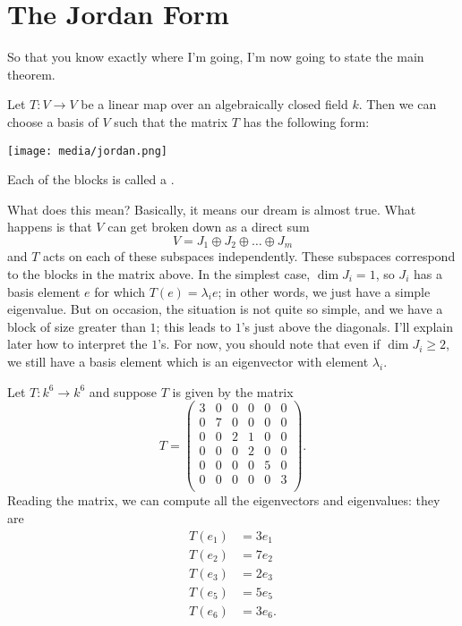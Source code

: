 \section{The Jordan Form}
So that you know exactly where I'm going, I'm now going to state the main theorem.
\begin{theorem}
	Let $T : V \to V$ be a linear map over an algebraically closed field $k$.
	Then we can choose a basis of $V$ such that the matrix $T$ has the following form:
	\begin{center}
		\texttt{[image: media/jordan.png]}
	\end{center}
	Each of the blocks is called a .
\end{theorem}
What does this mean?
Basically, it means our dream is almost true.
What happens is that $V$ can get broken down as a direct sum
\[ V = J_1 \oplus J_2 \oplus \dots \oplus J_m \]
and $T$ acts on each of these subspaces independently.
These subspaces correspond to the blocks in the matrix above.
In the simplest case, $\dim J_i = 1$, so $J_i$ has a basis element $e$ for which $T(e) = \lambda_i e$;
in other words, we just have a simple eigenvalue.
But on occasion, the situation is not quite so simple, and we have a block of size greater than $1$;
this leads to $1$'s just above the diagonals.
I'll explain later how to interpret the $1$'s.
For now, you should note that even if $\dim J_i \ge 2$, we still have a basis element
which is an eigenvector with element $\lambda_i$.

\begin{example}
	Let $T : k^6 \to k^6$ and suppose $T$ is given by the matrix
	\[ 
		T = 
		\left(
		\begin{array}{cccccc}
			3 & 0 & 0 & 0 & 0 & 0 \\
			0 & 7 & 0 & 0 & 0 & 0 \\
			0 & 0 & 2 & 1 & 0 & 0 \\
			0 & 0 & 0 & 2 & 0 & 0 \\
			0 & 0 & 0 & 0 & 5 & 0 \\
			0 & 0 & 0 & 0 & 0 & 3 \\
		\end{array}
		\right).
	\]
	Reading the matrix, we can compute all the eigenvectors and eigenvalues:
	they are
	\begin{align*}
		T(e_1) &= 3e_1 \\
		T(e_2) &= 7e_2 \\
		T(e_3) &= 2e_3 \\
		T(e_5) &= 5e_5 \\
		T(e_6) &= 3e_6.
	\end{align*}
\end{example}

